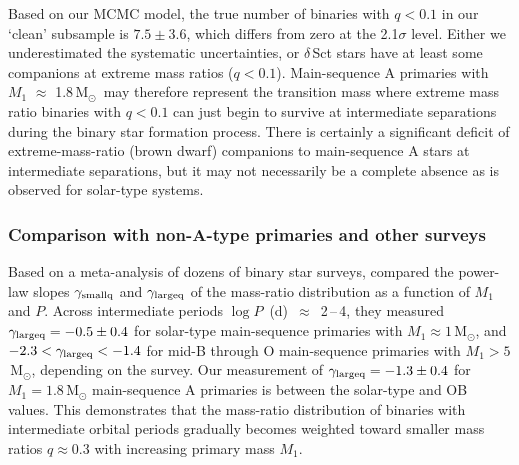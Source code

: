 \documentclass[a4paper,fleqn,usenatbib]{mnras}
\begin{document}
Based on our MCMC model, the true number of binaries with $q<0.1$ in our `clean' subsample is $7.5\pm3.6$, which differs from zero at the 2.1$\sigma$ level. Either we underestimated the systematic uncertainties, or $\delta$\,Sct stars have at least some companions at extreme mass ratios ($q<0.1$). Main-sequence A primaries with $M_1$ $\approx$ 1.8\,M$_{\odot}$\ may therefore represent the transition mass where extreme mass ratio binaries with $q<0.1$ can just begin to survive at intermediate separations during the binary star formation process. There is certainly a significant deficit of extreme-mass-ratio (brown dwarf) companions to main-sequence A stars at intermediate separations, but it may not necessarily be a complete absence as is observed for solar-type systems.


\subsubsection{Comparison with non-A-type primaries and other surveys} 
\label{ssec:lit_comp}

Based on a meta-analysis of dozens of binary star surveys, \citet{moe&distefano2017} compared the power-law slopes $\gamma_{\rm smallq}$ and $\gamma_{\rm largeq}$ of the mass-ratio distribution as a function of $M_1$ and $P$. Across intermediate periods $\log P$~(d)~$\approx$~2\,--\,4, they measured \mbox{$\gamma_{\rm largeq} = -0.5 \pm 0.4$} for solar-type main-sequence primaries with \mbox{$M_1 \approx 1$\,M$_{\odot}$}, and \mbox{$-2.3 < \gamma_{\rm largeq} < -1.4$} for mid-B through O main-sequence primaries with $M_1 > 5$\,M$_{\odot}$, depending on the survey. Our measurement of \mbox{$\gamma_{\rm largeq} = -1.3 \pm 0.4$} for $M_1 = 1.8$\,M$_{\odot}$ main-sequence A primaries is between the solar-type and OB values.  This demonstrates that the mass-ratio distribution of binaries with intermediate orbital periods gradually becomes weighted toward smaller mass ratios $q \approx 0.3$ with increasing primary mass $M_1$.
\end{document}
